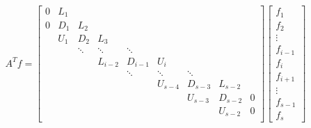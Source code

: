 \documentclass[11pt]{article}
\begin{document}
\[ A^Tf = \left[
\begin{array}{ccccccccc}
0 & L_{1}    &       &           &           &           &       &         & \\
0 & D_{1}    & L_{2}     &           &           &           &       &         & \\
      & U_{1} & D_{2}    & L_{3}     &           &           &           &         & \\
      &       & \ddots   & \ddots    & \ddots    &           &           &         & \\
      &       &          & L_{i-2}   & D_{i-1}   & U_{i}     &           &         & \\
      &       &          &           & \ddots    & \ddots    & \ddots    &         & \\
      &       &          &           &           & U_{s-4}   & D_{s-3}   & L_{s-2} & \\
      &      &       &          &           &           & U_{s-3}   & D_{s-2}   & 0 \\
  &      &       &           &           &           &       &      U_{s-2}  & 0 \\
\end{array} \right]
\left[ \begin{array}{c}
f_{1} \\ f_{2} \\ \vdots \\ f_{i-1} \\ f_{i} \\ f_{i+1} \\ \vdots \\ f_{s-1} \\ f_{s}
\end{array} \right]
\]
\end{document}

